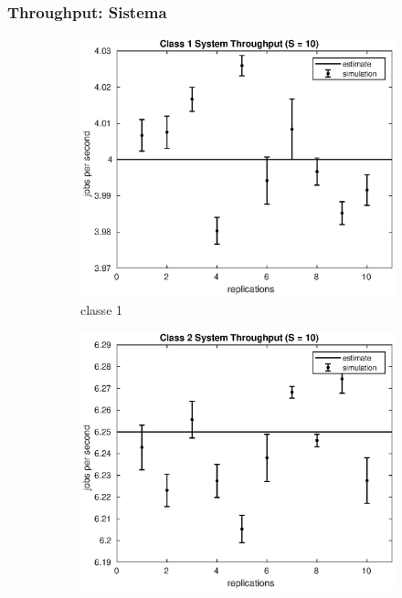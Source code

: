 \subsubsection{Throughput: Sistema}
%
\begin{figure}[!h]
\centering
%
\begin{subfigure}[t]{0.49\textwidth}
\includegraphics[width=\textwidth]{figures/simul/10_500K_x1}
\caption{classe 1}
\label{10_x1}
\end{subfigure}
%
\begin{subfigure}[t]{0.49\textwidth}
\includegraphics[width=\textwidth]{figures/simul/10_500K_x2}

\end{subfigure}
\end{figure}
